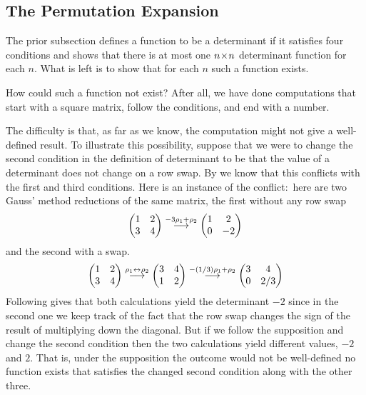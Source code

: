 \subsection{The Permutation Expansion}
The prior subsection defines a function to be a determinant if it
satisfies four conditions and
shows that there is at most one $n \! \times \! n$ determinant function for
each $n$.
What is left is to show that for each $n$ such a function exists.

How could such a function not exist?
After all, we have done computations that start with a square matrix,
follow the conditions, and end with a number.

The difficulty is that, as far as we know, 
the computation might not give a well-defined result.
To illustrate this possibility,
suppose that we were to change the second condition in the definition of
determinant to be that the value of a determinant does not change on 
a row swap.
By  we know that this conflicts with the
first and third conditions.
Here is an instance of the conflict:~here are
two Gauss' method reductions of the same matrix, the first without any row swap
\begin{equation*}
  \begin{pmatrix}
    1  &2  \\
    3  &4
  \end{pmatrix}
  \mathrel{ \mathop{\longrightarrow}\limits^{-3\rho_1+\rho_2\mathstrut}_{ \begin{subarray}{l} \relax \end{subarray}}}
  \begin{pmatrix}
    1  &2  \\
    0  &-2
  \end{pmatrix}
\end{equation*}
and the second with a swap.
\begin{equation*}
  \begin{pmatrix}
    1  &2  \\
    3  &4
  \end{pmatrix}
  \mathrel{ \mathop{\longrightarrow}\limits^{\rho_1\leftrightarrow\rho_2\mathstrut}_{ \begin{subarray}{l} \relax \end{subarray}}}
  \begin{pmatrix}
    3  &4  \\
    1  &2
  \end{pmatrix}
  \mathrel{ \mathop{\longrightarrow}\limits^{-(1/3)\rho_1+\rho_2\mathstrut}_{ \begin{subarray}{l} \relax \end{subarray}}}
  \begin{pmatrix}
    3  &4  \\
    0  &2/3
  \end{pmatrix}
\end{equation*}
Following  gives that both
calculations yield the determinant $-2$ 
since in the second one
we keep track of the fact that the row swap changes the sign of the result
of multiplying down the diagonal.
But if we follow the supposition and 
change the second condition then the two calculations yield
different values, $-2$ and $2$. 
That is, under the supposition the outcome would not be well-defined \Dash  no 
function exists that satisfies the changed second condition
along with the other three. 

